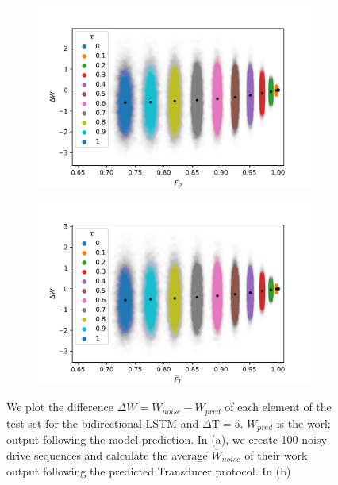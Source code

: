 \begin{figure}
	\centering
	\begin{subfigure}{0.4\textwidth}
		\centering
		\includegraphics[width=\textwidth]{img/noisy_drive_bi_true_3}
		\subcaption{}
	\end{subfigure}
	\begin{subfigure}{0.4\textwidth}
		\centering
		\includegraphics[width=\textwidth]{img/noisy_trans_bi_true_3}
		\subcaption{}
	\end{subfigure}
	\caption{We plot the difference $\Delta W = \overline{W}_{noise} - W_{pred}$ of each element of the test set for the bidirectional LSTM and $\Delta \mathrm{T} = 5$. $W_{pred}$ is the work output following the model prediction. In (a), we create 100 noisy drive sequences and calculate the average $\overline{W}_{noise}$ of their work output following the predicted Transducer protocol. In (b)}
\end{figure}